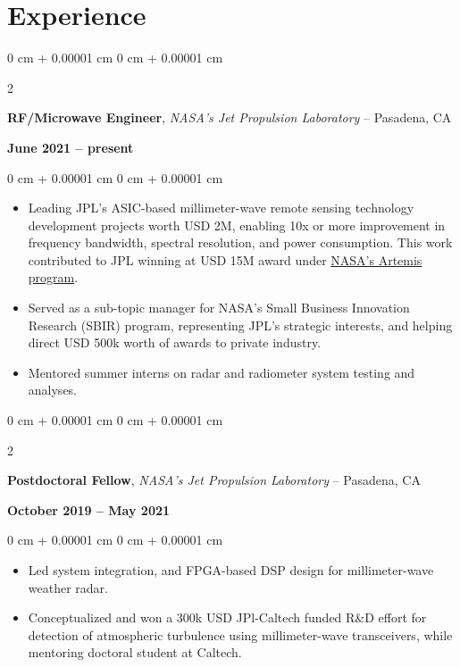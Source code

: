 \documentclass[10pt, letterpaper]{article}
\newenvironment{highlights}{
    \begin{itemize}[
        topsep=0.10 cm,
        parsep=0.10 cm,
        partopsep=0pt,
        itemsep=0pt,
        leftmargin=0 cm + 10pt     
    ]
}{
    \end{itemize}
} %
\newenvironment{onecolentry}{
    \begin{adjustwidth}{
        0 cm + 0.00001 cm
    }{
        0 cm + 0.00001 cm
    }
}{
    \end{adjustwidth}
} %
\newenvironment{twocolentry}[2][]{
    \onecolentry
    \def\secondColumn{#2}
    \setcolumnwidth{\fill, 4.5 cm}
    \begin{paracol}{2}
}{
    \switchcolumn \raggedleft \secondColumn
    \end{paracol}
    \endonecolentry
} %
\begin{document}
        \section{Experience}
        \begin{twocolentry}{
            \textbf{June 2021 – present}
        }
            \textbf{RF/Microwave Engineer}, \textit{NASA's Jet Propulsion Laboratory} -- Pasadena, CA
        \end{twocolentry}
        \vspace{0.30 cm}
        \begin{onecolentry}  
        \justifying
            \begin{highlights}
                \item Leading JPL's ASIC-based millimeter-wave remote sensing technology development projects worth USD 2M, enabling 10x or more improvement in frequency bandwidth, spectral resolution, and power consumption. This work contributed to JPL winning at USD 15M award under  \href{https://www.nasa.gov/news-release/nasa-selects-instruments-for-artemis-lunar-terrain-vehicle/}{NASA's Artemis program}.
                \item Served as a sub-topic manager for NASA's Small Business Innovation Research (SBIR) program, representing JPL's strategic interests, and helping direct USD 500k worth of awards to private industry. 
                \item Mentored summer interns on radar and radiometer system testing and analyses.  
            \end{highlights}
        \end{onecolentry}

        \vspace{0.4 cm}

        \begin{twocolentry}{
            \textbf{October 2019 – May 2021}
        }
            \textbf{Postdoctoral Fellow}, \textit{NASA's Jet Propulsion Laboratory} -- Pasadena, CA
        \end{twocolentry}
        \vspace{0.30 cm}
        \begin{onecolentry}
            \begin{highlights}
                \item Led system integration, and FPGA-based DSP design for millimeter-wave weather radar. 
                \item Conceptualized and won a 300k USD JPl-Caltech funded R\&D effort for detection of atmospheric turbulence using millimeter-wave transceivers, while mentoring doctoral student at Caltech.
            \end{highlights}
        \end{onecolentry}
    
\end{document}
